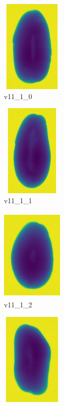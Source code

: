 \documentclass[11pt]{article}
\begin{document}
\begin{figure}
     \centering
     \begin{subfigure}[b]{0.15\textwidth}
         \centering
         \includegraphics[width=3cm, height=4.5cm]{images/kartofler/v11_1_0_cut.png}
         \caption{v11\_1\_0}
         \label{fig:y equals x}
     \end{subfigure}
     \hfill
     \begin{subfigure}[b]{0.15\textwidth}
         \centering
         \includegraphics[width=3cm, height=4.5cm]{images/kartofler/v11_1_1_cut.png}
        \caption{v11\_1\_1}
         \label{fig:three sin x}
     \end{subfigure}
     \hfill
     \begin{subfigure}[b]{0.15\textwidth}
         \centering
         \includegraphics[width=3cm, height=4.5cm]{images/kartofler/v11_1_2_cut.png}
        \caption{v11\_1\_2}
         \label{fig:five over x}
     \end{subfigure}
     \hfill
    \begin{subfigure}[b]{0.15\textwidth}
         \centering
         \includegraphics[width=3cm, height=4.5cm]{images/kartofler/v11_1_3_cut.png}

\end{subfigure}
\end{figure}
\end{document}
